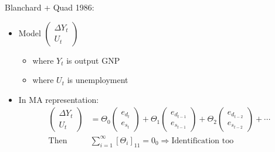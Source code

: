 Blanchard + Quad 1986: 
\begin{itemize}
    \item Model $\begin{pmatrix}
        \Delta Y_t \\
        U_t
    \end{pmatrix}$
    \begin{itemize}
        \item where $Y_t$ is output GNP
        \item where $U_t$ is unemployment
    \end{itemize}
    \item In MA representation: 
    \begin{align*}
        \begin{pmatrix}
            \Delta Y_t \\
            U_t
        \end{pmatrix} &= \Theta_0 \begin{pmatrix}
            e_{d_t} \\
            e_{s_t}
        \end{pmatrix} + \Theta_1 \begin{pmatrix}
            e_{d_{t-1}} \\
            e_{s_{t-1}}
        \end{pmatrix} + \Theta_2 \begin{pmatrix}
            e_{d_{t-2}}\\
            e_{s_{t-2}}
        \end{pmatrix} + \cdots \\
        \text{Then } &\sum_{i=1}^\infty \left[ \Theta_i \right]_{11} = 0_0 \Rightarrow \text{Identification too}
    \end{align*}
\end{itemize}

